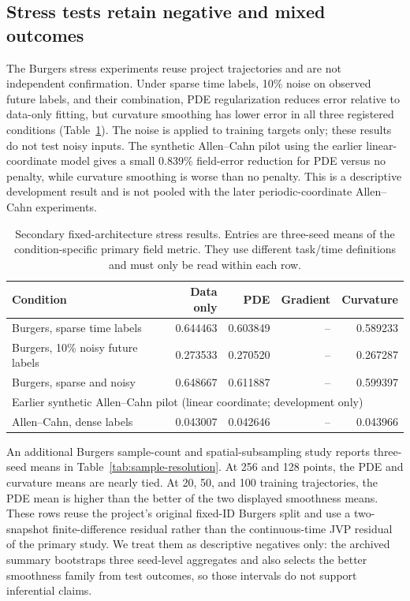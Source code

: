 \documentclass[a4paper,fleqn]{cas-sc}
\begin{document}
\subsection{Stress tests retain negative and mixed outcomes}
The Burgers stress experiments reuse project trajectories and are not independent confirmation. Under sparse time labels, 10\% noise on observed future labels, and their combination, PDE regularization reduces error relative to data-only fitting, but curvature smoothing has lower error in all three registered conditions (Table~\ref{tab:stress}). The noise is applied to training targets only; these results do not test noisy inputs. The synthetic Allen--Cahn pilot using the earlier linear-coordinate model gives a small 0.839\% field-error reduction for PDE versus no penalty, while curvature smoothing is worse than no penalty. This is a descriptive development result and is not pooled with the later periodic-coordinate Allen--Cahn experiments.

\begin{table}
\centering\small
\caption{Secondary fixed-architecture stress results. Entries are three-seed means of the condition-specific primary field metric. They use different task/time definitions and must only be read within each row.}
\label{tab:stress}
\begin{tabular}{lrrrr}
\toprule
Condition & Data only & PDE & Gradient & Curvature \\
\midrule
Burgers, sparse time labels & 0.644463 & 0.603849 & -- & 0.589233 \\
Burgers, 10\% noisy future labels & 0.273533 & 0.270520 & -- & 0.267287 \\
Burgers, sparse and noisy & 0.648667 & 0.611887 & -- & 0.599397 \\
\midrule
\multicolumn{5}{l}{Earlier synthetic Allen--Cahn pilot (linear coordinate; development only)} \\
Allen--Cahn, dense labels & 0.043007 & 0.042646 & -- & 0.043966 \\
\bottomrule
\end{tabular}
\end{table}

An additional Burgers sample-count and spatial-subsampling study reports three-seed means in Table~\ref{tab:sample-resolution}. At 256 and 128 points, the PDE and curvature means are nearly tied. At 20, 50, and 100 training trajectories, the PDE mean is higher than the better of the two displayed smoothness means. These rows reuse the project's original fixed-ID Burgers split and use a two-snapshot finite-difference residual rather than the continuous-time JVP residual of the primary study. We treat them as descriptive negatives only: the archived summary bootstraps three seed-level aggregates and also selects the better smoothness family from test outcomes, so those intervals do not support inferential claims.
\end{document}
